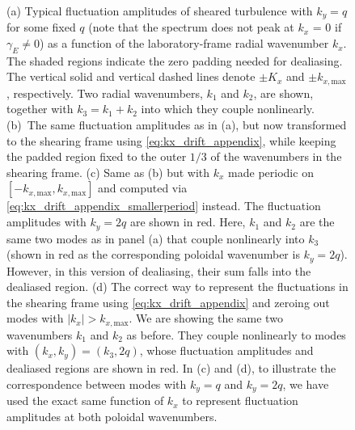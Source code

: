 \documentclass{jpp}
\newcommand{\gammaE}{\gamma_{E}}
\begin{document}
\begin{figure}
	\centering
	\hspace{-2mm}\scalebox{1.0}{}
	\hspace{-2mm}\scalebox{1.0}{}
	\hspace{-2mm}\scalebox{1.0}{}
	\hspace{-2mm}\scalebox{1.0}{}
	\caption{(a) Typical fluctuation amplitudes of sheared turbulence with \(k_y=q\) for some fixed \(q\) (note that the spectrum does not peak at \(k_x\) = 0 if \(\gammaE \neq 0\)) as a function of the laboratory-frame radial wavenumber \(k_x\). The shaded regions indicate the zero padding needed for dealiasing. The vertical solid and vertical dashed lines denote \(\pm K_x\) and \(\pm k_{x, \text{max}}\), respectively. Two radial wavenumbers, \(k_1\) and \(k_2\), are shown, together with \(k_3 = k_1 + k_2\) into which they couple nonlinearly. (b)~The same fluctuation amplitudes as in (a), but now transformed to the shearing frame using \cref{eq:kx_drift_appendix}, while keeping the padded region fixed to the outer \(1/3\) of the wavenumbers in the shearing frame. (c) Same as (b) but with \(k_x\) made periodic on \([-k_{x, \text{max}}, k_{x, \text{max}}]\) and computed via \cref{eq:kx_drift_appendix_smallerperiod} instead. The fluctuation amplitudes with \(k_y = 2q\) are shown in red. Here, \(k_1\) and \(k_2\) are the same two modes as in panel (a) that couple nonlinearly into \(k_3\) (shown in red as the corresponding poloidal wavenumber is \(k_y=2q\)). However, in this version of dealiasing, their sum falls into the dealiased region. (d) The correct way to represent the fluctuations in the shearing frame using \cref{eq:kx_drift_appendix} and zeroing out modes with \(|k_x| > k_{x, \text{max}}\). We are showing the same two wavenumbers \(k_1\) and \(k_2\) as before. They couple nonlinearly to modes with \((k_x, k_y) = (k_3, 2q)\), whose fluctuation amplitudes and dealiased regions are shown in red. In (c) and (d), to illustrate the correspondence between modes with \(k_y = q\) and \(k_y = 2q\), we have used the exact same function of \(k_x\) to represent fluctuation amplitudes at both poloidal wavenumbers.}
	\label{fig:aliasing}
\end{figure}
\end{document}
